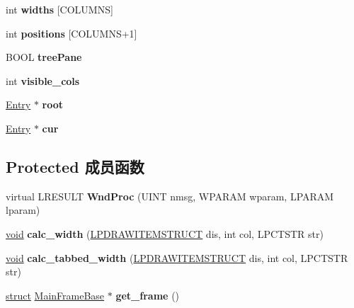 \begin{DoxyCompactItemize}
int {\bfseries widths} \mbox{[}C\+O\+L\+U\+M\+NS\mbox{]}
\item 
\mbox{\label{struct_pane_a122c5988eafd9912a0742f210c938a6a}} 
int {\bfseries positions} \mbox{[}C\+O\+L\+U\+M\+NS+1\mbox{]}
\item 
\mbox{\label{struct_pane_a9c8d644a1cc900a503a3c5f866471fc4}} 
B\+O\+OL {\bfseries tree\+Pane}
\item 
\mbox{\label{struct_pane_a9ead10b57e7fdaec154190c555ec5469}} 
int {\bfseries visible\+\_\+cols}
\item 
\mbox{\label{struct_pane_a4f6a947a0ec98eb6471163f6de6d9d3a}} 
\hyperlink{struct_entry}{Entry} $\ast$ {\bfseries root}
\item 
\mbox{\label{struct_pane_a86b0987ef08f3e3a936b2df033d17ca3}} 
\hyperlink{struct_entry}{Entry} $\ast$ {\bfseries cur}
\end{DoxyCompactItemize}
\subsection*{Protected 成员函数}
\begin{DoxyCompactItemize}
\item 
\mbox{\label{struct_pane_a86725e2d8c35d7545c1a39a60a696dbd}} 
virtual L\+R\+E\+S\+U\+LT {\bfseries Wnd\+Proc} (U\+I\+NT nmsg, W\+P\+A\+R\+AM wparam, L\+P\+A\+R\+AM lparam)
\item 
\mbox{\label{struct_pane_a1225118349914e3a9a3ef123869058f5}} 
\hyperlink{interfacevoid}{void} {\bfseries calc\+\_\+width} (\hyperlink{structtag_d_r_a_w_i_t_e_m_s_t_r_u_c_t}{L\+P\+D\+R\+A\+W\+I\+T\+E\+M\+S\+T\+R\+U\+CT} dis, int col, L\+P\+C\+T\+S\+TR str)
\item 
\mbox{\label{struct_pane_af02fdb76914a34fe9a53c9eeaf6d8320}} 
\hyperlink{interfacevoid}{void} {\bfseries calc\+\_\+tabbed\+\_\+width} (\hyperlink{structtag_d_r_a_w_i_t_e_m_s_t_r_u_c_t}{L\+P\+D\+R\+A\+W\+I\+T\+E\+M\+S\+T\+R\+U\+CT} dis, int col, L\+P\+C\+T\+S\+TR str)
\item 
\mbox{\label{struct_pane_ab4c6b4eaa69412964b6953af74071f8a}} 
\hyperlink{interfacestruct}{struct} \hyperlink{struct_main_frame_base}{Main\+Frame\+Base} $\ast$ {\bfseries get\+\_\+frame} ()
\end{DoxyCompactItemize}
